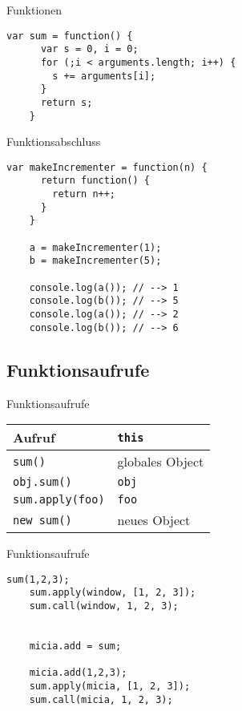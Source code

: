 \begin{frame}[fragile]{Funktionen}
  \begin{lstlisting}[gobble=4]
    var sum = function() {
      var s = 0, i = 0;
      for (;i < arguments.length; i++) {
        s += arguments[i];
      }
      return s;
    }
  \end{lstlisting}
\end{frame}

\begin{frame}[fragile]{Funktionsabschluss}
  \begin{lstlisting}[gobble=4]
    var makeIncrementer = function(n) {
      return function() {
        return n++;
      }
    }
    
    a = makeIncrementer(1);
    b = makeIncrementer(5);
    
    console.log(a()); // --> 1
    console.log(b()); // --> 5
    console.log(a()); // --> 2
    console.log(b()); // --> 6
  \end{lstlisting}
\end{frame}

\subsection{Funktionsaufrufe}

\begin{frame}{Funktionsaufrufe}
  \begin{tabular}{ll}
    Aufruf & \lstinline-this- \\ \hline
    \lstinline-sum()- & globales Object \\
    \lstinline-obj.sum()- & \lstinline-obj- \\
    \lstinline-sum.apply(foo)- & \lstinline-foo- \\
    \lstinline-new sum()- & neues Object
  \end{tabular}
\end{frame}

\begin{frame}[fragile]{Funktionsaufrufe}
  \begin{lstlisting}[gobble=4]
    sum(1,2,3);
    sum.apply(window, [1, 2, 3]);
    sum.call(window, 1, 2, 3);
    
    
    micia.add = sum;
    
    micia.add(1,2,3);
    sum.apply(micia, [1, 2, 3]);
    sum.call(micia, 1, 2, 3);
  \end{lstlisting}
\end{frame}

